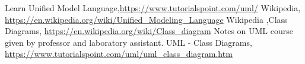 \begin{thebibliography}{99999}
\singlespace\normalsize

 Learn Unified Model Language,\url{https://www.tutorialspoint.com/uml/}
 Wikipedia, \url{https://en.wikipedia.org/wiki/Unified_Modeling_Language}
Wikipedia ,Class Diagrams, \url{https://en.wikipedia.org/wiki/Class_diagram}
 Notes on UML course given by professor and laboratory assistant.
 UML - Class Diagrams, \url{https://www.tutorialspoint.com/uml/uml_class_diagram.htm}




\end{thebibliography}
